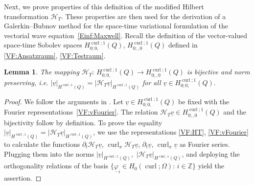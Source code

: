 \documentclass[a4paper,11pt]{article}
\newtheorem{lemma}[theorem]{Lemma}
\newcommand{\Z}{\mathbb Z}
\newcommand{\cu}{\operatorname{curl}}
\renewcommand{\vec}[1]{\underline{#1}}
\newcommand{\abs}[1]{\left\lvert{#1}\right\rvert}
\begin{document}
Next, we prove properties of this definition of the modified Hilbert transformation $\mathcal H_T$. These properties are then used for the derivation of a Galerkin--Bubnov method for the space-time variational formulation of the vectorial wave equation~\eqref{Einf:Maxwell}. Recall the definition of the vector-valued space-time Sobolev spaces $H^{\cu;1}_{0;0,}(Q)$, $H^{\cu;1}_{0;,0}(Q)$ defined in \eqref{VF:Ansatzraum}, \eqref{VF:Testraum}.

\begin{lemma} \label{VF:lem:HTIsometrie}
	The mapping ${\mathcal{H}}_T \colon \, H^{\cu;1}_{0;0,} (Q) \to H^{\cu;1}_{0;,0} (Q)$ is bijective and norm preserving, i.e. $\abs{\vec v}_{H^{\cu;1}(Q)} = \abs{\mathcal H_T \vec v}_{H^{\cu;1}(Q)}$ for all $ \vec v \in H^{\cu;1}_{0;0,} (Q).$
\end{lemma}
\begin{proof}
	We follow the arguments in \cite[Subsection~3.4.5]{ZankDissBuch2020}. Let $\vec v \in H^{\cu;1}_{0;0,} (Q)$ be fixed with the Fourier representations~\eqref{VF:vFourier}. The relation $\mathcal H_T \vec v \in H^{\cu;1}_{0;,0} (Q)$ and the bijectivity follow by definition. To prove the equality $\abs{\vec v}_{H^{\cu;1}(Q)} = \abs{\mathcal H_T \vec v}_{H^{\cu;1}(Q)}$, we use the representations \eqref{VF:HT}, \eqref{VF:vFourier} to calculate the functions $\partial_t \mathcal H_T \vec v$, $\cu_x \mathcal H_T \vec v$, $\partial_t \vec v$, $\cu_x \vec v$ as Fourier series. Plugging them into the norms $\abs{\vec v}_{H^{\cu;1}(Q)},$ $\abs{\mathcal H_T \vec v}_{H^{\cu;1}(Q)}$, and deploying the orthogonality relations of the basis $\{ \vec \varphi_i \in H_0(\cu;\Omega) : \, i \in \Z \}$ yield the assertion.
\end{proof}
\end{document}
